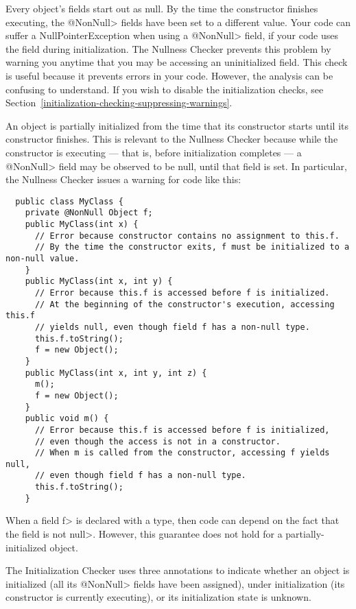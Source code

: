 Every object's fields start out as null.  By the time the constructor
finishes executing, the \<@NonNull> fields have been set to a different
value.  Your code can suffer a NullPointerException when using a
\<@NonNull> field, if your code uses the field during initialization.
The Nullness Checker prevents this problem by warning you anytime that you
may be accessing an uninitialized field.  This check is useful because it
prevents errors in your code.  However, the analysis can be confusing to
understand.  If you wish to disable the initialization checks, see
Section~\ref{initialization-checking-suppressing-warnings}.


An object is partially initialized from the time that its constructor starts until its constructor
finishes.  This is relevant to the Nullness Checker because while the
constructor is executing --- that is, before initialization completes ---
a \<@NonNull>
field may be observed to be null, until that field is set.  In
particular, the Nullness Checker issues a warning for code like this:

\begin{Verbatim}
  public class MyClass {
    private @NonNull Object f;
    public MyClass(int x) {
      // Error because constructor contains no assignment to this.f.
      // By the time the constructor exits, f must be initialized to a non-null value.
    }
    public MyClass(int x, int y) {
      // Error because this.f is accessed before f is initialized.
      // At the beginning of the constructor's execution, accessing this.f
      // yields null, even though field f has a non-null type.
      this.f.toString();
      f = new Object();
    }
    public MyClass(int x, int y, int z) {
      m();
      f = new Object();
    }
    public void m() {
      // Error because this.f is accessed before f is initialized,
      // even though the access is not in a constructor.
      // When m is called from the constructor, accessing f yields null,
      // even though field f has a non-null type.
      this.f.toString();
    }
\end{Verbatim}

\noindent
When a field \<f> is declared with a 
type, then code can depend on the fact that the field is not \<null>.
However, this guarantee does not hold for a partially-initialized object.

The Initialization Checker uses three annotations to indicate whether an object
is initialized (all its \<@NonNull> fields have been assigned), under
initialization (its constructor is currently executing), or its
initialization state is unknown.

